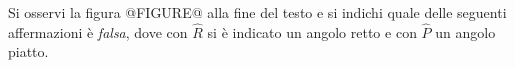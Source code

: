 Si osservi la 
figura @FIGURE@ alla fine del testo
 e si indichi quale delle seguenti 
affermazioni è \emph{falsa}, dove con $\widehat R$ si 
è indicato un angolo retto e con $\widehat P$ un angolo piatto.